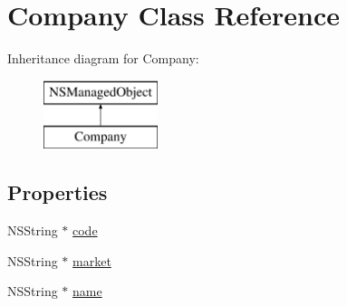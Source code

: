 \hypertarget{interface_company}{\section{Company Class Reference}
\label{interface_company}
}
Inheritance diagram for Company\-:\begin{figure}[H]
\begin{center}
\leavevmode
\includegraphics[height=2.000000cm]{interface_company}
\end{center}
\end{figure}
\subsection*{Properties}
\begin{DoxyCompactItemize}
\item 
N\-S\-String $\ast$ \hyperlink{interface_company_afdbbe5e3e648bdca9f87e311bf2c25ec}{code}
\item 
N\-S\-String $\ast$ \hyperlink{interface_company_a6f8c3fa2cd151fa275edf1b5628ab62b}{market}
\item 
N\-S\-String $\ast$ \hyperlink{interface_company_a1787b68b1525e89212ebc3fe8918e23b}{name}
\end{DoxyCompactItemize}


